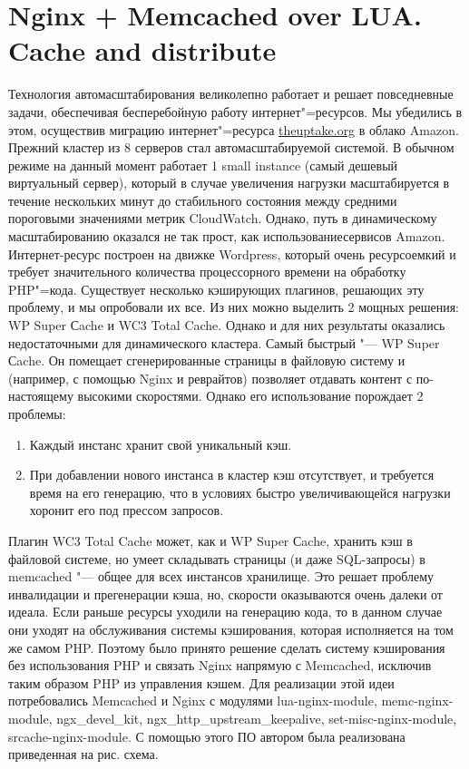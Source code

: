 \documentclass[10pt, a5paper]{article}
\begin{document}
\section*{Nginx + Memcached over LUA. Cache and distribute}

Технология автомасштабирования великолепно работает и решает повседневные задачи, обеспечивая бесперебойную работу интернет"=ресурсов. Мы убедились в этом, осуществив миграцию интернет"=ресурса \url{theuptake.org} в облако Amazon. Прежний кластер из 8 серверов стал автомасштабируемой системой. В обычном режиме на данный момент работает 1 small instance (самый дешевый виртуальный сервер), который в случае увеличения нагрузки масштабируется в течение нескольких минут до стабильного состояния между средними пороговыми значениями метрик CloudWatch. Однако, путь в динамическому масштабированию оказался не так прост, как использованиесервисов Amazon. Интернет-ресурс построен на движке Wordpress, который очень ресурсоемкий и требует значительного количества процессорного времени на обработку PHP"=кода. Существует несколько кэширующих плагинов, решающих эту проблему, и мы опробовали их все. Из них можно выделить 2 мощных решения:  WP Super Сache и WC3 Total Cache. Однако и для них результаты оказались недостаточными для динамического кластера. Самый быстрый "--- WP Super Сache. Он помещает сгенерированные страницы в файловую систему и (например, с помощью Nginx и реврайтов) позволяет отдавать контент с по-настоящему высокими скоростями. Однако его использование порождает 2 проблемы: 
\begin{enumerate}
	\item Каждый инстанс хранит свой уникальный кэш. 
	\item При добавлении нового инстанса в кластер кэш отсутствует, и требуется время на его генерацию, что в условиях быстро увеличивающейся нагрузки хоронит его под прессом запросов. 
\end{enumerate}

Плагин WC3 Total Cache может, как и WP Super Сache, хранить кэш в файловой системе, но умеет складывать страницы (и даже SQL-запросы) в memcached "--- общее для всех инстансов хранилище. Это решает проблему инвалидации и прегенерации кэша, но, скорости оказываются очень далеки от идеала. Если раньше ресурсы уходили на генерацию кода, то в данном случае они уходят на обслуживания системы кэширования, которая исполняется на том же самом PHP. Поэтому было принято решение сделать систему кэширования без использования PHP и связать Nginx напрямую с Memcached, исключив таким образом PHP из управления кэшем. Для реализации этой идеи потребовались Memcached и Nginx с модулями lua-nginx-module, memc-nginx-module, ngx\_devel\_kit,  ngx\_http\_upstream\_keepalive, set-misc-nginx-module, srcache-nginx-module. С помощью этого ПО автором была реализована приведенная на рис. схема.
\end{document}
